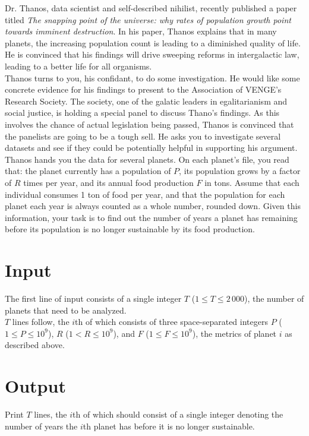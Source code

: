 
\noindent Dr. Thanos, data scientist and self-described nihilist, recently published a paper titled \textit{The snapping point of the universe: why rates of population growth point towards imminent destruction}. In his paper, Thanos explains that in many planets, the increasing population count is leading to a diminished quality of life. He is convinced that his findings will drive sweeping reforms in intergalactic law, leading to a better life for all organisms.\\

Thanos turns to you, his confidant, to do some investigation. He would like some concrete evidence for his findings to present to the Association of VENGE's Research Society. The society, one of the galatic leaders in egalitarianism and social justice, is holding a special panel to discuss Thano's findings. As this involves the chance of actual legislation being passed, Thanos is convinced that the panelists are going to be a tough sell. He asks you to investigate several datasets and see if they could be potentially helpful in supporting his argument.\\

Thanos hands you the data for several planets. On each planet's file, you read that: the planet currently has a population of $P$, its population grows by a factor of $R$ times per year, and its annual food production $F$ in tons. Assume that each individual consumes 1 ton of food per year, and that the population for each planet each year is always counted as a whole number, rounded down. Given this information, your task is to find out the number of years a planet has remaining before its population is no longer sustainable by its food production.

\section*{Input}
The first line of input consists of a single integer $T$ ($1 \leq T \leq 2\,000$), the number of planets that need to be analyzed.\\
$T$ lines follow, the $i$th of which consists of three space-separated integers $P$ ($1 \leq P \leq 10^9$), $R$ ($1 < R \leq 10^9$), and $F$ ($1 \leq F \leq 10^9$), the metrics of planet $i$ as described above.

\section*{Output}
Print $T$ lines, the $i$th of which should consist of a single integer denoting the number of years the $i$th planet has before it is no longer sustainable.\\
